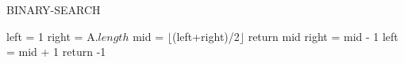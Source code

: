 \documentclass{article}
\begin{document}
\begin{algorithm}
	\caption{BINARY-SEARCH}
	\begin{algorithmic}[1]
		\State left = 1
		\State right = A.$length$
		  \State mid = $\lfloor$(left+right)/2$\rfloor$
		    \State return mid
		    \State right = mid - 1
		  \Else
		    \State left = mid + 1
		  \EndIf
		\EndWhile
		\State return -1
		\EndFunction
		
	\end{algorithmic}
\end{algorithm}
\end{document}
